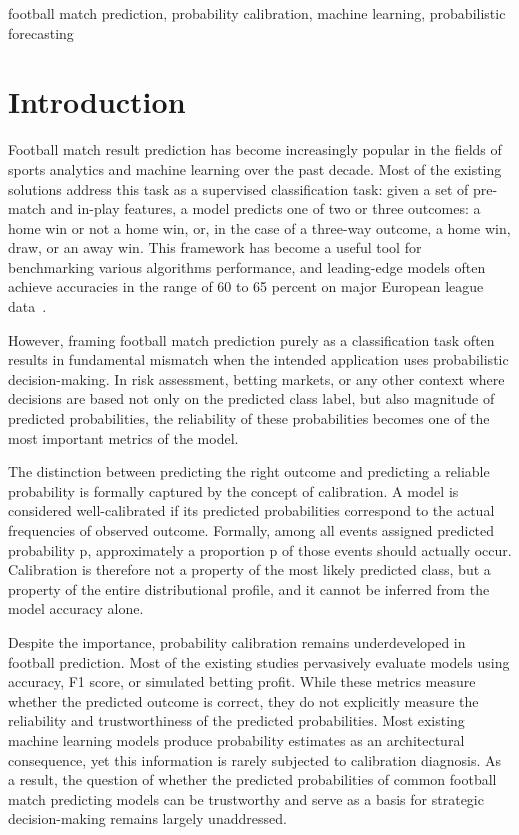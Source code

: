 \documentclass[conference]{IEEEtran}
\begin{document}
\begin{IEEEkeywords}
football match prediction, probability calibration, machine
learning, probabilistic forecasting
\end{IEEEkeywords}

\section{Introduction}
Football match result prediction has become increasingly popular
in the fields of sports analytics and machine learning over the
past decade. Most of the existing solutions address this task as
a supervised classification task: given a set of pre-match and
in-play features, a model predicts one of two or three outcomes:
a home win or not a home win, or, in the case of a three-way
outcome, a home win, draw, or an away win. This framework has
become a useful tool for benchmarking various algorithms
performance, and leading-edge models often achieve accuracies
in the range of 60 to 65 percent on major European league
data~\cite{b1}\cite{b2}\cite{b3}.

However, framing football match prediction purely as a
classification task often results in fundamental mismatch when
the intended application uses probabilistic decision-making. In
risk assessment, betting markets, or any other context where
decisions are based not only on the predicted class label, but
also magnitude of predicted probabilities, the reliability of
these probabilities becomes one of the most important metrics
of the model.

The distinction between predicting the right outcome and
predicting a reliable probability is formally captured by the
concept of calibration. A model is considered well-calibrated
if its predicted probabilities correspond to the actual
frequencies of observed outcome. Formally, among all events
assigned predicted probability p, approximately a proportion p
of those events should actually occur. Calibration is therefore
not a property of the most likely predicted class, but a
property of the entire distributional profile, and it cannot
be inferred from the model accuracy alone.

Despite the importance, probability calibration remains
underdeveloped in football prediction. Most of the existing
studies pervasively evaluate models using accuracy, F1 score,
or simulated betting profit. While these metrics measure whether
the predicted outcome is correct, they do not explicitly measure
the reliability and trustworthiness of the predicted
probabilities. Most existing machine learning models produce
probability estimates as an architectural consequence, yet this
information is rarely subjected to calibration diagnosis. As a result, the question of whether the predicted probabilities of common football match predicting models can be trustworthy and serve as a basis for strategic decision-making remains largely unaddressed.
\end{document}
